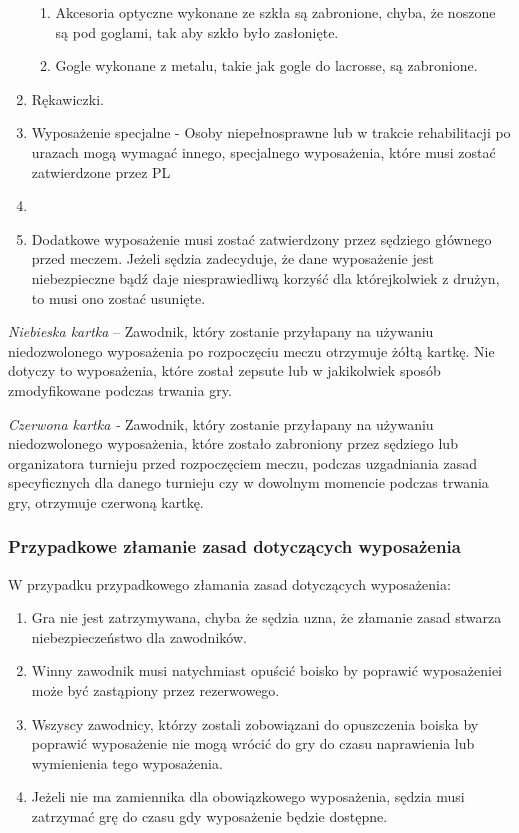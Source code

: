 \documentclass[12pt]{article}
\begin{document}
\begin{enumerate}
	      \begin{enumerate}
		      \item
		            Akcesoria optyczne wykonane ze szkła są zabronione, chyba, że
		            noszone są pod goglami, tak aby szkło było zasłonięte.
		      \item
		            Gogle wykonane z metalu, takie jak gogle do lacrosse, są zabronione.
	      \end{enumerate}
	\item
	      Rękawiczki.
	\item
	      Wyposażenie specjalne - Osoby niepełnosprawne lub w trakcie
	      rehabilitacji po urazach mogą wymagać innego, specjalnego wyposażenia,
	      które musi zostać zatwierdzone przez PL\item
	\item
	      Dodatkowe wyposażenie musi zostać zatwierdzony przez sędziego
	      głównego przed meczem. Jeżeli sędzia zadecyduje, że dane wyposażenie
	      jest niebezpieczne bądź daje niesprawiedliwą korzyść dla którejkolwiek
	      z drużyn, to musi ono zostać usunięte.
\end{enumerate}

\emph{Niebieska kartka} -- Zawodnik, który zostanie przyłapany na
używaniu niedozwolonego wyposażenia po rozpoczęciu meczu otrzymuje żółtą
kartkę. Nie dotyczy to wyposażenia, które został zepsute lub w
jakikolwiek sposób zmodyfikowane podczas trwania gry.

\emph{Czerwona kartka -} Zawodnik, który zostanie przyłapany na używaniu
niedozwolonego wyposażenia, które zostało zabroniony przez sędziego lub
organizatora turnieju przed rozpoczęciem meczu, podczas uzgadniania
zasad specyficznych dla danego turnieju czy w dowolnym momencie podczas
trwania gry, otrzymuje czerwoną kartkę.

\subsubsection{Przypadkowe złamanie zasad dotyczących wyposażenia}
W przypadku przypadkowego złamania zasad dotyczących wyposażenia:

\begin{enumerate}
	\item
	      Gra nie jest zatrzymywana, chyba że sędzia uzna, że złamanie zasad
	      stwarza niebezpieczeństwo dla zawodników.
	\item
	      Winny zawodnik musi natychmiast opuścić boisko by poprawić
	      wyposażeniei może być zastąpiony przez rezerwowego.
	\item
	      Wszyscy zawodnicy, którzy zostali zobowiązani do opuszczenia boiska by
	      poprawić wyposażenie nie mogą wrócić do gry do czasu naprawienia lub
	      wymienienia tego wyposażenia.
	\item
	      Jeżeli nie ma zamiennika dla obowiązkowego wyposażenia, sędzia musi
	      zatrzymać grę do czasu gdy wyposażenie będzie dostępne.
\end{enumerate}
\end{document}
